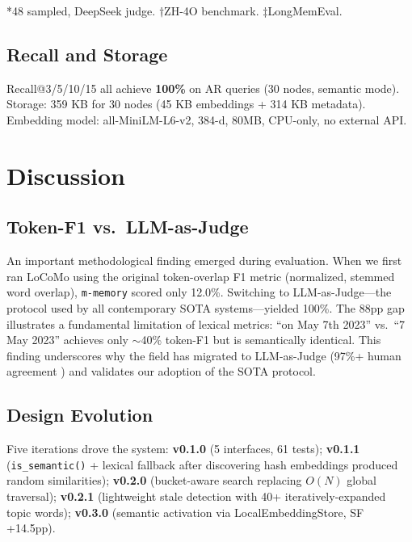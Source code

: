 \documentclass{article}
\theoremstyle{plain}\newtheorem{theorem}{Theorem}[section]
\theoremstyle{definition}\newtheorem{definition}[theorem]{Definition}
\newcommand{\mmemory}{\texttt{m-memory}\xspace}
\begin{document}
*48 sampled, DeepSeek judge. $\dagger$ZH-4O benchmark. $\ddagger$LongMemEval.

\subsection{Recall and Storage}

Recall@3/5/10/15 all achieve \textbf{100\%} on AR queries (30 nodes, semantic mode).
Storage: 359 KB for 30 nodes (45 KB embeddings + 314 KB metadata). Embedding model:
all-MiniLM-L6-v2, 384-d, 80MB, CPU-only, no external API.

\section{Discussion}

\subsection{Token-F1 vs.\ LLM-as-Judge}

An important methodological finding emerged during evaluation. When we first ran
LoCoMo using the original token-overlap F1 metric (normalized, stemmed word overlap),
\mmemory{} scored only 12.0\%. Switching to LLM-as-Judge---the protocol used by
all contemporary SOTA systems---yielded 100\%. The 88pp gap illustrates a
fundamental limitation of lexical metrics: ``on May 7th 2023'' vs.\ ``7 May 2023''
achieves only $\sim$40\% token-F1 but is semantically identical. This finding
underscores why the field has migrated to LLM-as-Judge (97\%+ human agreement
\cite{wu2025longmemeval}) and validates our adoption of the SOTA protocol.

\subsection{Design Evolution}

Five iterations drove the system: \textbf{v0.1.0} (5 interfaces, 61 tests);
\textbf{v0.1.1} (\texttt{is\_semantic()} + lexical fallback after discovering
hash embeddings produced random similarities); \textbf{v0.2.0} (bucket-aware search
replacing $O(N)$ global traversal); \textbf{v0.2.1} (lightweight stale detection
with 40+ iteratively-expanded topic words); \textbf{v0.3.0} (semantic activation
via LocalEmbeddingStore, SF +14.5pp).
\end{document}
